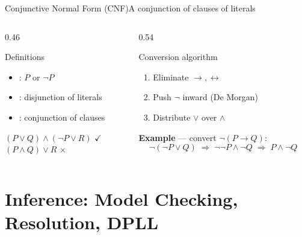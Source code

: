 \documentclass[aspectratio=169,11pt]{beamer}
\newcommand{\cmark}{\textcolor{SuccessGreen}{\ensuremath{\checkmark}}}
\newcommand{\xmark}{\textcolor{AlertRed}{\ensuremath{\times}}}
\begin{document}
\begin{frame}{Conjunctive Normal Form (CNF)}{A conjunction of clauses of literals}
  \begin{columns}[T]
    \begin{column}{0.46\textwidth}
      \begin{block}{Definitions}
        \small
        \begin{itemize}
          \item {}: $P$ or $\neg P$
          \item {}: disjunction of literals
          \item {}: conjunction of clauses
        \end{itemize}
      \end{block}
      \centering\scriptsize
      $(P\lor Q)\land(\neg P\lor R)$ \cmark \\
      $(P\land Q)\lor R$ \xmark
    \end{column}
    \begin{column}{0.54\textwidth}
      \begin{exampleblock}{Conversion algorithm}
        \small
        \begin{enumerate}
          \item Eliminate $\rightarrow,\leftrightarrow$
          \item Push $\neg$ inward (De Morgan)
          \item Distribute $\lor$ over $\land$
        \end{enumerate}
      \end{exampleblock}
      \scriptsize
      \textbf{Example} — convert $\neg(P\rightarrow Q)$:
      \[ \neg(\neg P\lor Q) \;\Rightarrow\; \neg\neg P\land\neg Q \;\Rightarrow\; P\land\neg Q \]
    \end{column}
  \end{columns}
\end{frame}

\section{Inference: Model Checking, Resolution, DPLL}
\end{document}
